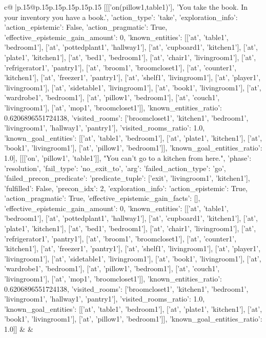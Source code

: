 \documentclass{article}
\begin{document}
{\begin{supertabular}{c@{$\;$}|p{.15\linewidth}@{}p{.15\linewidth}p{.15\linewidth}p{.15\linewidth}p{.15\linewidth}p{.15\linewidth}}
{{{	 [[['on(pillow1,table1)'], 'You take the book. In your inventory you have a book.', {'action_type': 'take', 'exploration_info': {'action_epistemic': False, 'action_pragmatic': True, 'effective_epistemic_gain_amount': 0, 'known_entities': [['at', 'table1', 'bedroom1'], ['at', 'pottedplant1', 'hallway1'], ['at', 'cupboard1', 'kitchen1'], ['at', 'plate1', 'kitchen1'], ['at', 'bed1', 'bedroom1'], ['at', 'chair1', 'livingroom1'], ['at', 'refrigerator1', 'pantry1'], ['at', 'broom1', 'broomcloset1'], ['at', 'counter1', 'kitchen1'], ['at', 'freezer1', 'pantry1'], ['at', 'shelf1', 'livingroom1'], ['at', 'player1', 'livingroom1'], ['at', 'sidetable1', 'livingroom1'], ['at', 'book1', 'livingroom1'], ['at', 'wardrobe1', 'bedroom1'], ['at', 'pillow1', 'bedroom1'], ['at', 'couch1', 'livingroom1'], ['at', 'mop1', 'broomcloset1']], 'known_entities_ratio': 0.6206896551724138, 'visited_rooms': ['broomcloset1', 'kitchen1', 'bedroom1', 'livingroom1', 'hallway1', 'pantry1'], 'visited_rooms_ratio': 1.0, 'known_goal_entities': [['at', 'table1', 'bedroom1'], ['at', 'plate1', 'kitchen1'], ['at', 'book1', 'livingroom1'], ['at', 'pillow1', 'bedroom1']], 'known_goal_entities_ratio': 1.0}}], [[['on', 'pillow1', 'table1']], "You can't go to a kitchen from here.", {'phase': 'resolution', 'fail_type': 'no_exit_to', 'arg': {'failed_action_type': 'go', 'failed_precon_predicate': {'predicate_tuple': ['exit', 'livingroom1', 'kitchen1'], 'fulfilled': False, 'precon_idx': 2}}, 'exploration_info': {'action_epistemic': True, 'action_pragmatic': True, 'effective_epistemic_gain_facts': [], 'effective_epistemic_gain_amount': 0, 'known_entities': [['at', 'table1', 'bedroom1'], ['at', 'pottedplant1', 'hallway1'], ['at', 'cupboard1', 'kitchen1'], ['at', 'plate1', 'kitchen1'], ['at', 'bed1', 'bedroom1'], ['at', 'chair1', 'livingroom1'], ['at', 'refrigerator1', 'pantry1'], ['at', 'broom1', 'broomcloset1'], ['at', 'counter1', 'kitchen1'], ['at', 'freezer1', 'pantry1'], ['at', 'shelf1', 'livingroom1'], ['at', 'player1', 'livingroom1'], ['at', 'sidetable1', 'livingroom1'], ['at', 'book1', 'livingroom1'], ['at', 'wardrobe1', 'bedroom1'], ['at', 'pillow1', 'bedroom1'], ['at', 'couch1', 'livingroom1'], ['at', 'mop1', 'broomcloset1']], 'known_entities_ratio': 0.6206896551724138, 'visited_rooms': ['broomcloset1', 'kitchen1', 'bedroom1', 'livingroom1', 'hallway1', 'pantry1'], 'visited_rooms_ratio': 1.0, 'known_goal_entities': [['at', 'table1', 'bedroom1'], ['at', 'plate1', 'kitchen1'], ['at', 'book1', 'livingroom1'], ['at', 'pillow1', 'bedroom1']], 'known_goal_entities_ratio': 1.0}}]] 
	  } 
	   } 
	   } 
	 & & \\ 
 


\end{supertabular}}
\end{document}
